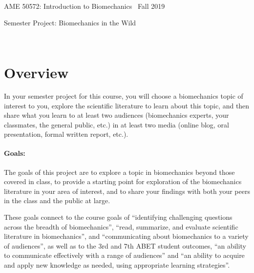 \documentclass[11pt]{article}
\begin{document}
\begin{center}
AME 50572: Introduction to Biomechanics \, Fall 2019

{\Large Semester Project: Biomechanics in the Wild} 
\end{center}

\hrulefill \\

\section*{Overview}

In your semester project for this course, you will choose a biomechanics topic of interest to you, explore the scientific literature to learn about this topic, and then share what you learn to at least two audiences (biomechanics experts, your classmates, the general public, etc.) in at least two media (online blog, oral presentation, formal written report, etc.).   

\paragraph{Goals:}
The goals of this project are to explore a topic in biomechanics beyond those covered in class, 
to provide a starting point for exploration of the biomechanics literature in your area of interest, 
and to share your findings with both your peers in the class and the public at large.  

These goals connect to the course goals of ``identifying challenging questions across the breadth of biomechanics'', ``read, summarize, and evaluate scientific literature in biomechanics'', and ``communicating about biomechanics to a variety of audiences'', as well as to the 3rd and 7th ABET student outcomes, ``an ability to communicate effectively with a range of audiences'' and ``an ability to acquire and apply new knowledge as needed, using appropriate learning strategies''.

\end{document}
